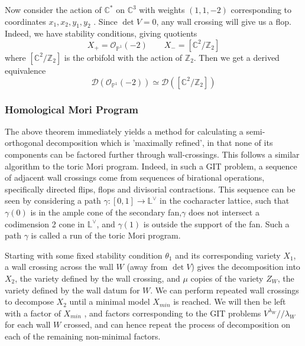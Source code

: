 \begin{example}{}{}
    Now consider the action of $\mathbb{C}^{*}$ on $\mathbb{C}^3$ with weights $(1,1,-2)$ corresponding to coordinates $x_{1},x_{2},y_1,y_2$ .  Since $\det V = 0$, any wall crossing will give us a flop. Indeed, we have stability conditions, giving quotients $$X_{+}= \mathcal{O}_{\mathbb{P}^{1}}(-2) \qquad X_{-}= [\mathbb{C}^{2}/ \mathbb{Z}_2]  $$where $[\mathbb{C}^2/\mathbb{Z}_2]$ is the orbifold with the action of $\mathbb{Z}_2$. Then we get a derived equivalence $$\mathcal{D}(\mathcal{O}_{\mathbb{P}^{1}}(-2))\simeq \mathcal{D}([\mathbb{C}^{2}/\mathbb{Z}_{2}])$$
\end{example}


\subsubsection{Homological Mori Program}

The above theorem immediately yields a method for calculating a semi-orthogonal decomposition which is 'maximally refined', in that none of its components can be factored further through wall-crossings. This follows a similar algorithm to the toric Mori program. Indeed, in such a GIT problem, a sequence of adjacent wall crossings come from sequences of birational operations, specifically directed flips, flops and divisorial contractions. This sequence can be seen by considering a path $\gamma : [0,1] \to \mathbb{L}^\vee$ in the cocharacter lattice, such that $\gamma(0)$ is in the ample cone of the secondary fan,$\gamma$ does not intersect a codimension 2 cone in $\mathbb{L}^\vee$, and $\gamma(1)$ is outside the support of the fan. Such a path $\gamma$ is called a run of the toric Mori program.

Starting with some fixed stability condition $\theta _1$ and its corresponding variety $X_1$, a wall crossing across the wall $W$ (away from $\det V$) gives the decomposition into $X_2$, the variety defined by the wall crossing, and $\mu$ copies of the variety $Z_W$, the variety defined by the wall datum for $W$. We can perform repeated wall crossings to decompose $X_2$ until a minimal model $X_{min}$ is reached. We will then be left with a factor of $X_{min}$ , and factors corresponding to the GIT problems $V^{\lambda_{W}} / / \lambda_{W}$ for each wall $W$ crossed, and can hence repeat the process of decomposition on each of the remaining non-minimal factors.


